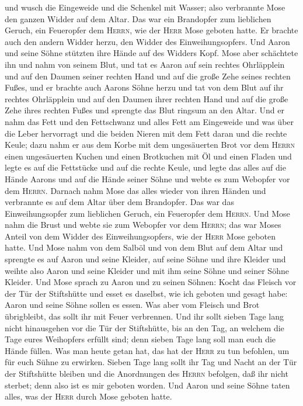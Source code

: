 und wusch die Eingeweide und die Schenkel mit Wasser; also verbrannte
Mose den ganzen Widder auf dem Altar. Das war ein Brandopfer zum
lieblichen Geruch, ein Feueropfer dem \textsc{Herrn}, wie der
\textsc{Herr} Mose geboten hatte.  Er brachte auch den
andern Widder herzu, den Widder des Einweihungsopfers. Und Aaron und
seine Söhne stützten ihre Hände auf des Widders Kopf. 
Mose aber schächtete ihn und nahm von seinem Blut, und tat es Aaron auf
sein rechtes Ohrläpplein und auf den Daumen seiner rechten Hand und auf
die große Zehe seines rechten Fußes,  und er brachte auch
Aarons Söhne herzu und tat von dem Blut auf ihr rechtes Ohrläpplein und
auf den Daumen ihrer rechten Hand und auf die große Zehe ihres rechten
Fußes und sprengte das Blut ringsum an den Altar.  Und er
nahm das Fett und den Fettschwanz und alles Fett am Eingeweide und was
über die Leber hervorragt und die beiden Nieren mit dem Fett daran und
die rechte Keule;  dazu nahm er aus dem Korbe mit dem
ungesäuerten Brot vor dem \textsc{Herrn} einen ungesäuerten Kuchen und
einen Brotkuchen mit Öl und einen Fladen und legte es auf die Fettstücke
und auf die rechte Keule,  und legte das alles auf die
Hände Aarons und auf die Hände seiner Söhne und webte es zum Webopfer
vor dem \textsc{Herrn}.  Darnach nahm Mose das alles
wieder von ihren Händen und verbrannte es auf dem Altar über dem
Brandopfer. Das war das Einweihungsopfer zum lieblichen Geruch, ein
Feueropfer dem \textsc{Herrn}.  Und Mose nahm die Brust
und webte sie zum Webopfer vor dem \textsc{Herrn}; das war Moses Anteil
von dem Widder des Einweihungsopfers, wie der \textsc{Herr} Mose geboten
hatte.  Und Mose nahm von dem Salböl und von dem Blut auf
dem Altar und sprengte es auf Aaron und seine Kleider, auf seine Söhne
und ihre Kleider und weihte also Aaron und seine Kleider und mit ihm
seine Söhne und seiner Söhne Kleider.  Und Mose sprach zu
Aaron und zu seinen Söhnen: Kocht das Fleisch vor der Tür der
Stiftshütte und esset es daselbst, wie ich geboten und gesagt habe:
Aaron und seine Söhne sollen es essen.  Was aber vom
Fleisch und Brot übrigbleibt, das sollt ihr mit Feuer verbrennen.
 Und ihr sollt sieben Tage lang nicht hinausgehen vor die
Tür der Stiftshütte, bis an den Tag, an welchem die Tage eures
Weihopfers erfüllt sind; denn sieben Tage lang soll man euch die Hände
füllen.  Was man heute getan hat, das hat der
\textsc{Herr} zu tun befohlen, um für euch Sühne zu erwirken.
 Sieben Tage lang sollt ihr Tag und Nacht an der Tür der
Stiftshütte bleiben und die Anordnungen des \textsc{Herrn} befolgen, daß
ihr nicht sterbet; denn also ist es mir geboten worden. 
Und Aaron und seine Söhne taten alles, was der \textsc{Herr} durch Mose
geboten hatte.

